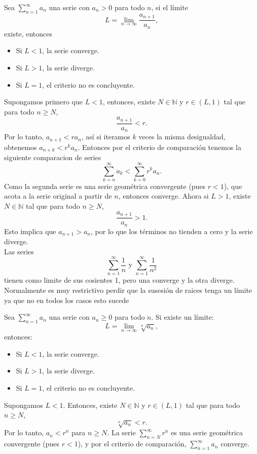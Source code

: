\documentclass[main.tex]{subfiles}
\begin{document}
\begin{prop}
Sea \(\sum_{n=1}^\infty a_n\) una serie con \(a_n > 0\) para todo \(n\), si el límite
\[
L = \lim_{n \to \infty} \frac{a_{n+1}}{a_n},
\]
existe, entonces
\begin{itemize}
\item Si \(L < 1\), la serie converge.
\item Si \(L > 1\), la serie diverge.
\item Si \(L = 1\), el criterio no es concluyente.
\end{itemize}
\end{prop}
\dem Supongamos primero que \(L < 1\), entonces, existe \(N \in \mathbb{N}\) y \(r \in (L, 1)\) tal que para todo \(n \geq N\),
\[
\frac{a_{n+1}}{a_n} < r.
\]
Por lo tanto, \(a_{n+1} < r a_n\), así si iteramos \(k\) veces la misma desigualdad, obtenemos \(a_{n+k} < r^k a_n\).
Entonces por el criterio de comparación tenemos la siguiente  comparacion de series
\[
    \sum_{k=n}^\infty a_k<\sum_{k=0}^\infty r^k a_n.
    \]
Como la segunda serie es una serie geométrica convergente (pues \(r < 1\)), que acota a la serie original a partir de \(n\), entonces converge.
Ahora si \(L > 1\), existe \(N \in \mathbb{N}\) tal que para todo \(n \geq N\),
\[
\frac{a_{n+1}}{a_n} > 1.
\]
Esto implica que \(a_{n+1} > a_n\), por lo que los términos no tienden a cero y la serie diverge.
\QED\\
\eje Las series
\[
\sum_{n=1}^{\infty}\frac{1}{n}\text{ y }\sum_{n=1}^{\infty}\frac{1}{n^2}
\]
tienen como limite de sus cosientes 1, pero una converge y la otra diverge.
Normalmente es muy restrictivo perdir que la susesión de raices tenga un límite ya que no en todos los casos esto sucede
\begin{prop}
Sea \(\sum_{n=1}^\infty a_n\) una serie con \(a_n \geq 0\) para todo \(n\). Si existe un límite:
\[
L = \lim_{n \to \infty} \sqrt[n]{a_n},
\]
entonces:
\begin{itemize}
    \item Si \(L < 1\), la serie converge.
    \item Si \(L > 1\), la serie diverge.
    \item Si \(L = 1\), el criterio no es concluyente.
\end{itemize}
\end{prop}
\dem Supongamos \(L < 1\). Entonces, existe \(N \in \mathbb{N}\) y \(r \in (L, 1)\) tal que para todo \(n \geq N\),
\[
\sqrt[n]{a_n} < r.
\]
Por lo tanto, \(a_n < r^n\) para \(n \geq N\). La serie \(\sum_{n=N}^\infty r^n\) es una serie geométrica convergente (pues \(r < 1\)), y por el criterio de comparación, \(\sum_{n=1}^\infty a_n\) converge.
\end{document}
